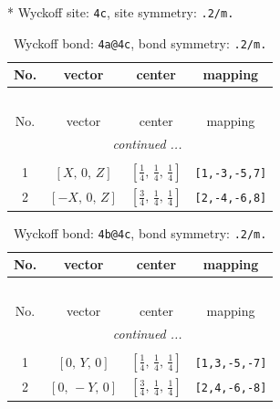 \documentclass[fleqn,8pt]{jsarticle}
\begin{document}
* Wyckoff site: {\tt 4c}, site symmetry: {\tt .2/m.}
\renewcommand{\arraystretch}{1.2}
\begin{longtable}{cccc}
\caption{Wyckoff bond: {\tt 4a@4c}, bond symmetry: {\tt .2/m.}}
 \\
 \hline \hline
No. & vector & center & mapping \\ \hline \endfirsthead

\multicolumn{3}{l}{\tablename\ \thetable{}} \\
 \hline \hline
No. & vector & center & mapping \\ \hline \endhead

 \hline \hline
\multicolumn{3}{r}{\footnotesize\it continued ...} \\ \endfoot

 \hline \hline
\multicolumn{3}{r}{} \\ \endlastfoot

1 & $\left[ X,\, 0,\, Z \right]$ & $\left[ \frac{1}{4},\, \frac{1}{4},\, \frac{1}{4} \right]$ & {\tt [1,-3,-5,7]} \\ \hline
2 & $\left[ - X,\, 0,\, Z \right]$ & $\left[ \frac{3}{4},\, \frac{1}{4},\, \frac{1}{4} \right]$ & {\tt [2,-4,-6,8]} \\
\end{longtable}
\renewcommand{\arraystretch}{1.2}
\begin{longtable}{cccc}
\caption{Wyckoff bond: {\tt 4b@4c}, bond symmetry: {\tt .2/m.}}
 \\
 \hline \hline
No. & vector & center & mapping \\ \hline \endfirsthead

\multicolumn{3}{l}{\tablename\ \thetable{}} \\
 \hline \hline
No. & vector & center & mapping \\ \hline \endhead

 \hline \hline
\multicolumn{3}{r}{\footnotesize\it continued ...} \\ \endfoot

 \hline \hline
\multicolumn{3}{r}{} \\ \endlastfoot

1 & $\left[ 0,\, Y,\, 0 \right]$ & $\left[ \frac{1}{4},\, \frac{1}{4},\, \frac{1}{4} \right]$ & {\tt [1,3,-5,-7]} \\ \hline
2 & $\left[ 0,\, - Y,\, 0 \right]$ & $\left[ \frac{3}{4},\, \frac{1}{4},\, \frac{1}{4} \right]$ & {\tt [2,4,-6,-8]} \\
\end{longtable}
\renewcommand{\arraystretch}{1.2}
\end{document}
